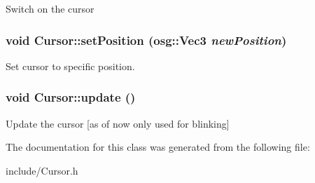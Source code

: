 \label{class_cursor_a3ca49b518bc6cca718f0a5d04595d1cf}
Switch on the cursor \hypertarget{class_cursor_a0079aea0a93588c7951f0bf869599300}{
\subsubsection[{setPosition}]{\setlength{\rightskip}{0pt plus 5cm}void Cursor::setPosition (osg::Vec3 {\em newPosition})}}
\label{class_cursor_a0079aea0a93588c7951f0bf869599300}
Set cursor to specific position. \hypertarget{class_cursor_a022993b56c498cd92001c99116f1081a}{
\subsubsection[{update}]{\setlength{\rightskip}{0pt plus 5cm}void Cursor::update ()}}
\label{class_cursor_a022993b56c498cd92001c99116f1081a}
Update the cursor \mbox{[}as of now only used for blinking\mbox{]} 

The documentation for this class was generated from the following file:\begin{DoxyCompactItemize}
\item 
include/Cursor.h\end{DoxyCompactItemize}
